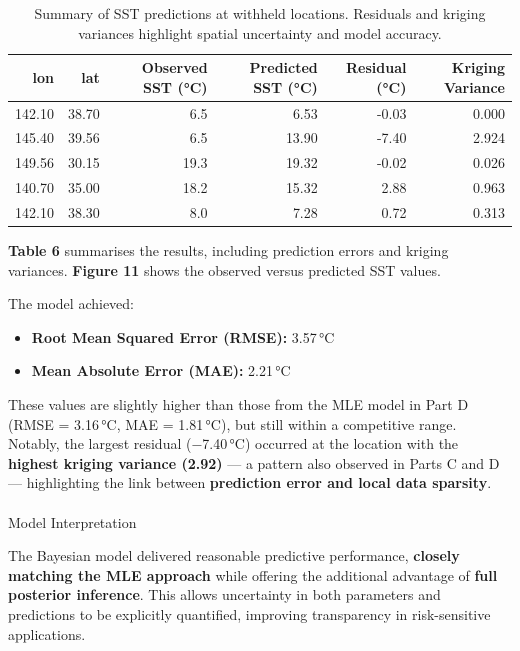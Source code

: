 \documentclass[
  11pt,
]{article}
\makeatletter
\let\oldparagraph\paragraph
\renewcommand{\paragraph}{
    \@ifstar
      \xxxParagraphStar
      \xxxParagraphNoStar
  }
\newcommand{\xxxParagraphStar}[1]{\oldparagraph*{#1}\mbox{}}
\newcommand{\xxxParagraphNoStar}[1]{\oldparagraph{#1}\mbox{}}
\makeatother
\begin{document}
\begin{table}

\caption{Summary of SST predictions at withheld locations. Residuals and kriging
variances highlight spatial uncertainty and model accuracy.}
\centering
\begin{tabular}[t]{rrrrrr}
\toprule
lon & lat & Observed SST (°C) & Predicted SST (°C) & Residual (°C) & Kriging Variance\\
\midrule
142.10 & 38.70 & 6.5 & 6.53 & -0.03 & 0.000\\
145.40 & 39.56 & 6.5 & 13.90 & -7.40 & 2.924\\
149.56 & 30.15 & 19.3 & 19.32 & -0.02 & 0.026\\
140.70 & 35.00 & 18.2 & 15.32 & 2.88 & 0.963\\
142.10 & 38.30 & 8.0 & 7.28 & 0.72 & 0.313\\
\bottomrule
\end{tabular}
\end{table}

\textbf{Table 6} summarises the results, including prediction errors and
kriging variances. \textbf{Figure 11} shows the observed versus
predicted SST values.

The model achieved:

\begin{itemize}
\item
  \textbf{Root Mean Squared Error (RMSE):} 3.57\,°C
\item
  \textbf{Mean Absolute Error (MAE):} 2.21\,°C
\end{itemize}

These values are slightly higher than those from the MLE model in Part D
(RMSE = 3.16\,°C, MAE = 1.81\,°C), but still within a competitive range.
Notably, the largest residual (−7.40\,°C) occurred at the location with
the \textbf{highest kriging variance (2.92)} --- a pattern also observed
in Parts C and D --- highlighting the link between \textbf{prediction
error and local data sparsity}.

\paragraph{Model Interpretation}\label{model-interpretation}

The Bayesian model delivered reasonable predictive performance,
\textbf{closely matching the MLE approach} while offering the additional
advantage of \textbf{full posterior inference}. This allows uncertainty
in both parameters and predictions to be explicitly quantified,
improving transparency in risk-sensitive applications.
\end{document}
